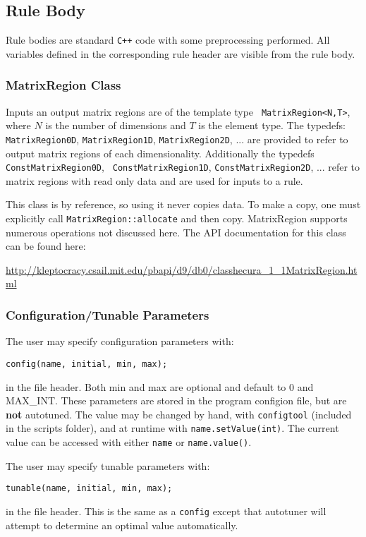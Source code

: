 \documentclass[11pt]{article}
\begin{document}
\subsection{Rule Body}
\label{sec:body}

Rule bodies are standard {\tt C++} code with some preprocessing performed.
All variables defined in the corresponding rule header are visible from the 
rule body.

\subsubsection{MatrixRegion Class}
Inputs an output matrix regions are of the template type {\tt
MatrixRegion<N,T>}, where $N$ is the number of dimensions and $T$ is the
element type.  The typedefs: {\tt MatrixRegion0D}, {\tt MatrixRegion1D},
{\tt MatrixRegion2D}, ... are provided to refer to output matrix regions of each
dimensionality.  Additionally the typedefs {\tt ConstMatrixRegion0D}, {\tt
ConstMatrixRegion1D}, {\tt ConstMatrixRegion2D}, ... refer to matrix
regions with read only data and are used for inputs to a rule.

This class is by reference, so using it never copies data. To make a copy,
one must explicitly call {\tt MatrixRegion::allocate} and then copy.
MatrixRegion supports numerous operations not discussed here.  The API
documentation for this class can be found here:

\noindent
\url{http://kleptocracy.csail.mit.edu/pbapi/d9/db0/classhecura_1_1MatrixRegion.html}

\subsubsection{Configuration/Tunable Parameters}

The user may specify configuration parameters with:
\begin{verbatim}
config(name, initial, min, max);
\end{verbatim}
in the file header.  Both min and max are optional and default to 0 and
MAX\_INT.  These parameters are stored in the program configion file, but are
{\bf not} autotuned.  The value may be changed by hand, with {\tt configtool}
(included in the scripts folder), and at runtime with {\tt name.setValue(int)}.
The current value can be accessed with either {\tt name} or {\tt name.value()}.

The user may specify tunable parameters with:
\begin{verbatim}
tunable(name, initial, min, max);
\end{verbatim}
in the file header.  This is the same as a {\tt config} except that autotuner 
will attempt to determine an optimal value automatically.
\end{document}
